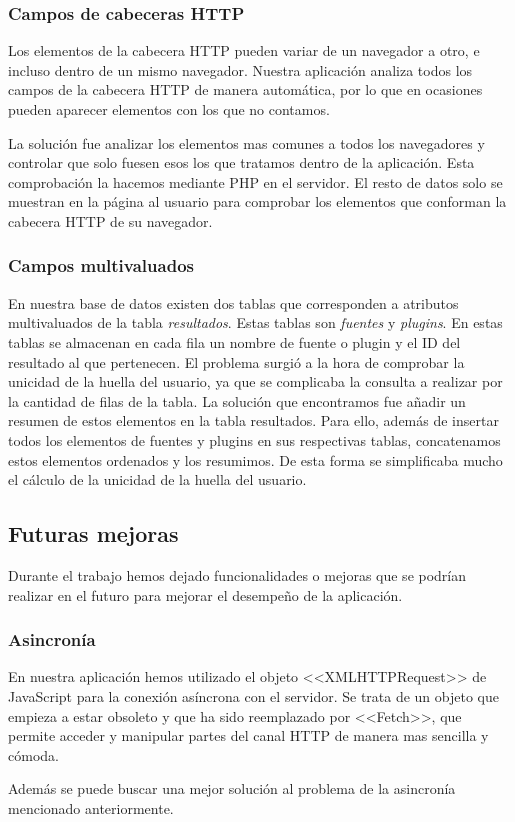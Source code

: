 \subsubsection{Campos de cabeceras HTTP}
Los elementos de la cabecera HTTP pueden variar de un navegador a otro, e incluso dentro de un mismo navegador. Nuestra aplicación analiza todos los campos de la cabecera HTTP de manera automática, por lo que en ocasiones pueden aparecer elementos con los que no contamos.\par 
La solución fue analizar los elementos mas comunes a todos los navegadores y controlar que solo fuesen esos los que tratamos dentro de la aplicación. Esta comprobación la hacemos mediante PHP en el servidor. El resto de datos solo se muestran en la página al usuario para comprobar los elementos que conforman la cabecera HTTP de su navegador.
\subsubsection{Campos multivaluados}
En nuestra base de datos existen dos tablas que corresponden a atributos multivaluados de la tabla \textit{resultados}. Estas tablas son \textit{fuentes} y \textit{plugins}. En estas tablas se almacenan en cada fila un nombre de fuente o plugin y el ID del resultado al que pertenecen. El problema surgió a la hora de comprobar la unicidad de la huella del usuario, ya que se complicaba la consulta a realizar por la cantidad de filas de la tabla. La solución que encontramos fue añadir un resumen de estos elementos en la tabla resultados. Para ello, además de insertar todos los elementos de fuentes y plugins en sus respectivas tablas, concatenamos estos elementos ordenados y los resumimos. De esta forma se simplificaba mucho el cálculo de la unicidad de la huella del usuario.
\subsection{Futuras mejoras}
Durante el trabajo hemos dejado funcionalidades o mejoras que se podrían realizar en el futuro para mejorar el desempeño de la aplicación.
\subsubsection{Asincronía}
En nuestra aplicación hemos utilizado el objeto <<XMLHTTPRequest>> de JavaScript para la conexión asíncrona con el servidor. Se trata de un objeto que empieza a estar obsoleto y que ha sido reemplazado por <<Fetch>>, que permite acceder y manipular partes del canal HTTP de manera mas sencilla y cómoda.\par 
Además se puede buscar una mejor solución al problema de la asincronía mencionado anteriormente.
